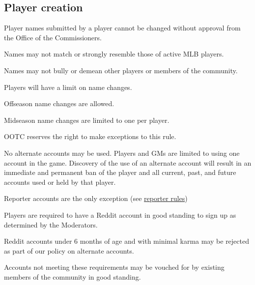 \subsection{Player creation}
\begin{deepEnumerate}
	\item Player names submitted by a player cannot be changed without approval from the Office of the Commissioners.
	\begin{deepEnumerate}
		\item Names may not match or strongly resemble those of active MLB players.
		\item Names may not bully or demean other players or members of the community.
		\item Players will have a limit on name changes.
		\begin{deepEnumerate}
			\item Offseason name changes are allowed.
			\item Midseason name changes are limited to one per player.
			\item OOTC reserves the right to make exceptions to this rule.
		\end{deepEnumerate}
		\item No alternate accounts may be used. Players and GMs are limited to using one account in the game.
		Discovery of the use of an alternate account will result in an immediate and permanent ban of the player
		and all current, past, and future accounts used or held by that player.
		\begin{deepEnumerate}
			\item Reporter accounts are the only exception (see \hyperref[sec:reporters]{reporter rules})
		\end{deepEnumerate}
	\end{deepEnumerate}
	\item Players are required to have a Reddit account in good standing to sign up as determined by the Moderators.
	\begin{deepEnumerate}
		\item Reddit accounts under 6 months of age and with minimal karma may be rejected as part of our policy on alternate accounts.
		\begin{deepEnumerate}
			\item Accounts not meeting these requirements may be vouched for by existing members of the community in good standing.
		\end{deepEnumerate}
	\end{deepEnumerate}

\end{deepEnumerate}
